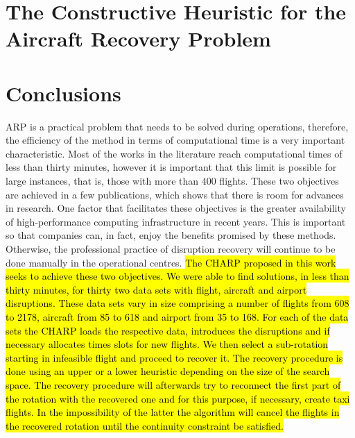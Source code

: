 \documentclass[ijoo,nonblindrev]{informs-ijoo}
\begin{document}
\section{The Constructive Heuristic for the Aircraft Recovery Problem}\label{sec:algorithms}







\section{Conclusions}\label{sec:conclusions}

ARP is a practical problem that needs to be solved during operations, therefore, the efficiency of the method in terms of computational time is a very important characteristic. Most of the works in the literature reach computational times of less than thirty minutes, however it is important that this limit is possible for large instances, that is, those with more than 400 flights. These two objectives are achieved in a few publications, which shows that there is room for advances in research. One factor that facilitates these objectives is the greater availability of high-performance computing infrastructure in recent years. This is important so that companies can, in fact, enjoy the benefits promised by these methods. Otherwise, the professional practice of disruption recovery will continue to be done manually in the operational centres. 
\hl{The CHARP proposed in this work seeks to achieve these two objectives. We were able to find solutions, in less than thirty minutes, for thirty two data sets with flight, aircraft and airport disruptions. These data sets vary in size comprising a number of flights from 608 to  2178, aircraft from 85 to 618 and airport from 35 to 168. For each of the data sets the CHARP loads the respective data, introduces the disruptions and if necessary allocates times slots for new flights. We then select a sub-rotation starting in infeasible flight and proceed to recover it. The recovery procedure is done using an upper or a lower heuristic depending on the size of the search space. The recovery procedure will afterwards try to reconnect the first part of the rotation with the recovered one and for this purpose, if necessary, create taxi flights. In the impossibility of the latter the algorithm will cancel the flights in the recovered rotation until the continuity constraint be satisfied.}
\end{document}
